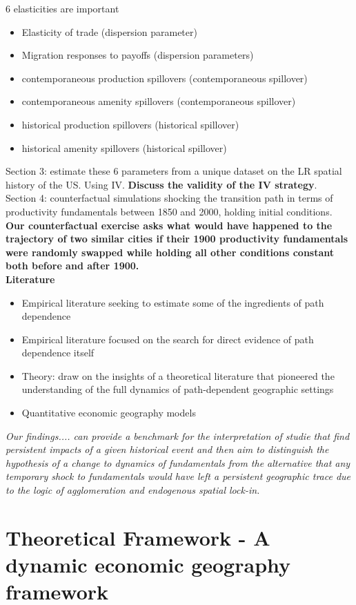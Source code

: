 \documentclass[10pt, final]{article}
\begin{document}
6 elasticities are important
\begin{itemize}
    \item Elasticity of trade (dispersion parameter)
    \item Migration responses to payoffs (dispersion parameters)
    \item contemporaneous production spillovers (contemporaneous spillover)
    \item contemporaneous amenity spillovers (contemporaneous spillover)
    \item historical production spillovers (historical spillover)
    \item historical amenity spillovers (historical spillover)
\end{itemize}
Section 3: estimate these 6 parameters from a unique dataset on the LR spatial history of the US. Using IV. \textbf{Discuss the validity of the IV strategy}. \\
Section 4: counterfactual simulations shocking the transition path in terms of productivity fundamentals between 1850 and 2000, holding initial conditions.
\\
\textbf{Our counterfactual exercise asks what would have happened  to the trajectory of two similar cities if their 1900 productivity fundamentals were randomly swapped while holding all other conditions constant both before and after 1900.}
\\
\textbf{Literature}
\begin{itemize}
    \item Empirical literature seeking to estimate some of the ingredients of path dependence 
    \item Empirical literature focused on the search for direct evidence of path dependence itself
    \item Theory: draw on the insights of a theoretical literature that pioneered the understanding of the full dynamics of path-dependent geographic settings
    \item Quantitative economic geography models
\end{itemize}
\textit{Our findings.... can provide a benchmark for the interpretation of studie that find persistent impacts of a given historical event and then aim to distinguish the hypothesis of a change to dynamics of fundamentals from the alternative that any temporary shock to fundamentals would have left a persistent geographic trace due to the logic of agglomeration and endogenous spatial lock-in.}

\section{Theoretical Framework - A dynamic economic geography framework}  %
\label{sec:theoretical_framework}
\end{document}
